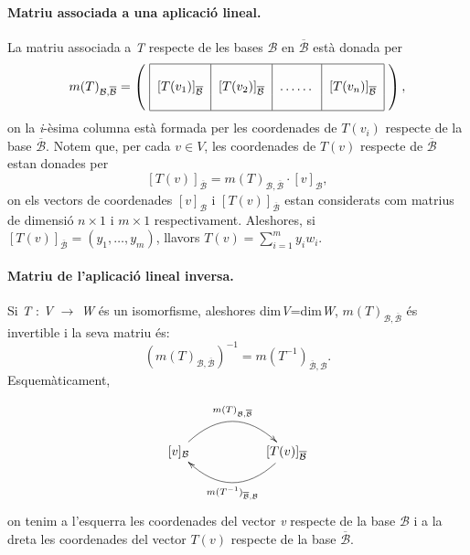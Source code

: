 \documentclass[a4paper,12pt]{article}
\begin{document}
\paragraph{Matriu associada a una aplicació lineal.} La matriu associada a \textit{T} respecte de les bases $\mathcal{B}$ en $\overline{\mathcal{B}}$ està donada per \begin{equation}
m(T)_{\mathcal{B},\overline{\mathcal{B}}} = \left( \  \begin{tabular}{|c|c|c|c|}
\hline & & & \\ $[T(v_{1})]_{\overline{\mathcal{B}}}$ & $[T(v_{2})]_{\overline{\mathcal{B}}}$ & \ldots \ldots & $[T(v_{n})]_{\overline{\mathcal{B}}}$ \\ & & & \\
 \hline
 \end{tabular} \ \right), \end{equation} on la \textit{i}-èsima columna està formada per les coordenades de $T(v_{i})$ respecte de la base $\overline{\mathcal{B}}$. Notem que, per cada $v \in V$, les coordenades de $T(v)$ respecte de $\overline{\mathcal{B}}$ estan donades per \begin{equation} \label{eq:3} [T(v)]_{\overline{\mathcal{B}}}= m(T)_{\mathcal{B},\overline{\mathcal{B}}} \cdot [v]_{\mathcal{B}}, \end{equation} on els vectors de coordenades $[v]_{\mathcal{B}}$ i $[T(v)]_{\overline{\mathcal{B}}}$ estan considerats com matrius de dimensió $n \times 1$ i $m \times 1$ respectivament. Aleshores, si $[T(v)]_{\overline{\mathcal{B}}}=(y_{1},\ldots,y_{m})$, llavors $T(v)=\sum_{i=1}^m y_{i}w_{i}$.
\paragraph{Matriu de l'aplicació lineal inversa.} Si \textit{T} : \textit{V} $\rightarrow$ \textit{W} és un isomorfisme, aleshores dim\textit{V}=dim\textit{W}, $m(T)_{\mathcal{B},\overline{\mathcal{B}}}$ és invertible i la seva matriu és: $$(m(T)_{\mathcal{B},\overline{\mathcal{B}}})^{-1}= m(T^{-1})_{\overline{\mathcal{B}},\mathcal{B}}.$$
Esquemàticament,

\begin{equation}
\xymatrix{ [v]_{\mathcal{B}} \ar@/^2pc/[rr]^{m(T)_{\mathcal{B},\overline{\mathcal{B}}}}  &   & [T(v)]_{\overline{\mathcal{B}}} \ar@/^2pc/[ll]^{m(T^{-1})_{\overline{\mathcal{B}},\mathcal{B}}}}
\end{equation}
on tenim a l'esquerra les coordenades del vector \textit{v} respecte de la base $\mathcal{B}$ i a la dreta les coordenades del vector $T(v)$ respecte de la base $\overline{\mathcal{B}}$.
\end{document}
